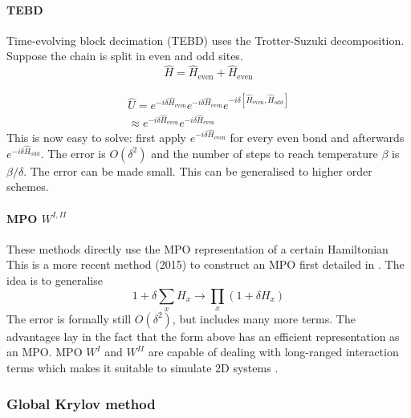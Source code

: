 \paragraph{TEBD}\label{para:TEBD}
Time-evolving block decimation (TEBD)  uses the Trotter-Suzuki decomposition. Suppose the chain is split in even and odd sites.
\begin{equation}
    \hat{H} = \hat{H}_{\text{even}}+\hat{H}_{\text{even}}
\end{equation}

\begin{equation}\label{trotter_exp}
    \begin{split}
        \hat{U} = e^{-i \delta \hat{H}_{\text{even}}}  e^{-i \delta \hat{H}_{\text{even}} }e^{-i \delta \left[ \hat{H}_{\text{even}}, \hat{H}_{\text{odd}} \right] }\\
        \approx e^{-i \delta \hat{H}_{\text{even}}}  e^{-i \delta \hat{H}_{\text{even}} }
    \end{split}
\end{equation}
This is now easy to solve: first apply $e^{-i \delta \hat{H}_{\text{even}}}$ for every even bond and afterwards  $e^{-i \delta \hat{H}_{\text{odd}}}$. The error is $O(\delta^2)$ and the number of steps to reach temperature $\beta$ is $\beta / \delta$. The error can be made small. This can be generalised to higher order schemes.

\paragraph{ MPO $W^{I,II}$}
These methods directly use the MPO representation of a certain Hamiltonian
This is a more recent method (2015) to construct an MPO first detailed in \cite{Zaletel2015}. The idea is to generalise
\begin{equation}
    1+ \delta \sum_x H_x \rightarrow \prod_x (1+  \delta H_x)
\end{equation}
The error is formally still $O(\delta^2)$, but includes many more terms. The advantages lay in the fact that the form above has an efficient representation as an MPO. MPO $W^I$ and $W^{II}$ are capable of dealing with long-ranged interaction terms which makes it suitable to simulate 2D systems \cite{Paeckel2019}.

\subsubsection{Global Krylov method}

